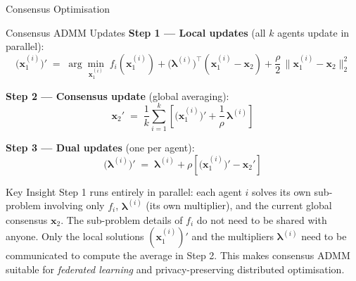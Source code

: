 \documentclass[aspectratio=169,10pt]{beamer}
\newcommand{\bx}{\mathbf{x}}
\newcommand{\blam}{\boldsymbol{\lambda}}
\begin{document}
\begin{frame}[allowframebreaks]{Consensus Optimisation}
  \framebreak

  \begin{block}{Consensus ADMM Updates}
    \textbf{Step 1 --- Local updates} (all $k$ agents update in parallel):
    \[
      \bigl(\bx_1^{(i)}\bigr)' \;=\; \arg\min_{\bx_1^{(i)}}\;
      f_i\!\left(\bx_1^{(i)}\right)
      + \bigl(\blam^{(i)}\bigr)^\top\!\left(\bx_1^{(i)} - \bx_2\right)
      + \frac{\rho}{2}\,\bigl\|\bx_1^{(i)} - \bx_2\bigr\|_2^2
    \]

    \textbf{Step 2 --- Consensus update} (global averaging):
    \[
      \bx_2' \;=\; \frac{1}{k}\sum_{i=1}^k
      \left[\bigl(\bx_1^{(i)}\bigr)' + \frac{1}{\rho}\,\blam^{(i)}\right]
    \]

    \textbf{Step 3 --- Dual updates} (one per agent):
    \[
      \bigl(\blam^{(i)}\bigr)' \;=\; \blam^{(i)}
      + \rho\left[\bigl(\bx_1^{(i)}\bigr)' - \bx_2'\right]
    \]
  \end{block}

  \begin{alertblock}{Key Insight}
    Step 1 runs entirely in parallel: each agent $i$ solves its own
    sub-problem involving only $f_i$, $\blam^{(i)}$ (its own multiplier),
    and the current global consensus $\bx_2$.  The sub-problem details of
    $f_i$ do not need to be shared with anyone.  Only the local solutions
    $(\bx_1^{(i)})'$ and the multipliers $\blam^{(i)}$ need to be
    communicated to compute the average in Step 2.  This makes consensus
    ADMM suitable for \emph{federated learning} and privacy-preserving
    distributed optimisation.
  \end{alertblock}

\end{frame}
\end{document}
